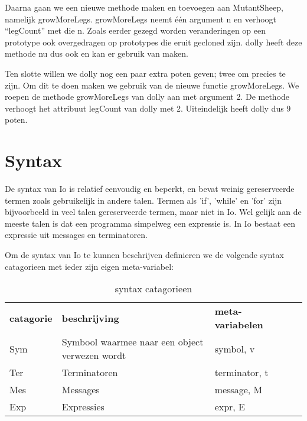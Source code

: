 \documentclass[12pt]{article}
\begin{document}
Daarna gaan we een nieuwe methode maken en toevoegen aan MutantSheep, namelijk growMoreLegs.
growMoreLegs neemt \'e\'en argument n en verhoogt ``legCount'' met die n. Zoals eerder gezegd worden veranderingen op een prototype ook overgedragen op prototypes die eruit gecloned zijn. dolly heeft deze methode nu dus ook en kan er gebruik van maken.\newline

Ten slotte willen we dolly nog een paar extra poten geven; twee om precies te zijn.
Om dit te doen maken we gebruik van de nieuwe functie growMoreLegs.
We roepen de methode growMoreLegs van dolly aan met argument 2.
De methode verhoogt het attribuut legCount van dolly met 2.
Uiteindelijk heeft dolly dus 9 poten.

\pagebreak
\section{Syntax}

De syntax van Io is relatief eenvoudig en beperkt, en bevat weinig gereserveerde termen zoals gebruikelijk in andere talen. Termen als 'if', 'while' en 'for' zijn bijvoorbeeld in veel talen gereserveerde termen, maar niet in Io. Wel gelijk aan de meeste talen is dat een programma simpelweg een expressie is. In Io bestaat een expressie uit messages en terminatoren. 

Om de syntax van Io te kunnen beschrijven definieren we de volgende syntax catagorieen met ieder zijn eigen meta-variabel:

\begin{table}[]
	\centering
	\begin{tabular}{lllll}
		\textbf{catagorie} & \textbf{beschrijving}                          & \textbf{meta-variabelen} &  &  \\
		Sym                & Symbool waarmee naar een object verwezen wordt & symbol, v                      &  &  \\
		Ter                & Terminatoren                                   & terminator, t                      &  &  \\
		Mes                & Messages                                       & message, M                      &  &  \\
		Exp                & Expressies                                     & expr, E                      &  & 
	\end{tabular}
	\label{catagorieen}
	\caption{syntax catagorieen}
\end{table} 
\end{document}
